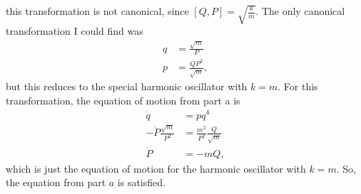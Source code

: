 \documentclass[10pt]{article}
\begin{document}
this transformation is not canonical, since $[Q,P]=\sqrt{\frac{k}{m}}$.  The 
only canonical transformation I could find was
\begin{align*}
  q&=\frac{\sqrt{m}}{P}\\
  p&=\frac{QP^2}{\sqrt{m}},
\end{align*}
but this reduces to the special harmonic oscillator with $k=m$.  For this 
transformation, the equation of motion from part a is 
\begin{align*}
  \dot{q} &= pq^4\\
  -\dot{P}\frac{\sqrt{m}}{P^2} &= \frac{m^2}{P^2} \frac{Q}{\sqrt{m}}\\
  \dot{P} &= -mQ,
\end{align*}
which is just the equation of motion for the harmonic oscillator with $k=m$.
So, the equation from part $a$ is satisfied.
\end{document}
